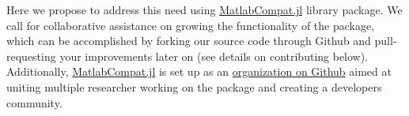 Here we propose to address this need using \href{https://github.com/MatlabCompat/MatlabCompat.jl}{MatlabCompat.jl} library package. We call for collaborative assistance on growing the functionality of the package, which can be accomplished by forking our source code through Github and pull-requesting your improvements later on (see details on contributing below). Additionally, \href{http://matlabcompat.github.io/}{MatlabCompat.jl} is set up as an \href{https://github.com/MatlabCompat}{organization on Github} aimed at uniting multiple researcher working on the package and creating a developers community.
  
  
  
  
  